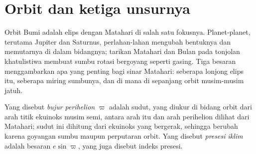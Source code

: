 \section{Orbit dan ketiga unsurnya}\label{sec:b2:orbital-forcing:elements}

Orbit Bumi adalah elips dengan Matahari di salah satu fokusnya. Planet-planet, terutama Jupiter dan Saturnus,
perlahan-lahan mengubah bentuknya dan memutarnya di dalam bidangnya; tarikan Matahari dan Bulan pada tonjolan
khatulistiwa membuat sumbu rotasi bergoyang seperti gasing. Tiga besaran menggambarkan apa yang penting bagi
sinar Matahari: seberapa lonjong elips itu, seberapa miring sumbunya, dan di mana di sepanjang orbit
musim-musim jatuh.

\begin{definition}\label{def:b2:orbital-forcing:elements}
Yang disebut \emph{bujur perihelion} $\varpi$ adalah sudut, yang diukur di
bidang orbit dari arah titik ekuinoks musim semi, antara arah itu dan
arah perihelion dilihat dari Matahari; sudut ini dihitung dari ekuinoks yang bergerak, sehingga
berubah karena goyangan sumbu maupun perputaran orbit. Yang disebut \emph{presesi
iklim} adalah besaran $e\sin\varpi$, yang juga disebut indeks
presesi.
\end{definition}

